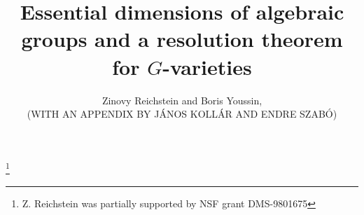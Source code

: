 \newcommand{\k}{{\bold k}}

\newcommand{\isomo}{\overset{\sim}{=}}
\newcommand{\isomoto}{\overset{\sim}{\to}}
\newcommand{\greater}{\underset{\sim}{>}}
\newcommand{\brokrarr}{\dasharrow}
\newcommand{\lf}{\mathopen}

\let \ringaccent=\r  %

\let\r=\mathclose

\newcommand{\notdiv}{\mathrel{\not|}}

\newcommand{\paru}{Parusi\'nski}

\let\to=\longrightarrow

\let\tilde=\widetilde
\let\hat=\widehat
{}

\newcommand{\Ker}{\operatorname{Ker}}
\newcommand{\Aut}{\operatorname{Aut}}
\newcommand{\sdp}{\mathbin{{>}\!{\triangleleft}}}
\newcommand{\Graph}{\operatorname{Graph}}
\newcommand{\Alt}{\operatorname{A}}
\newcommand{\GL}{\operatorname{GL}}
\newcommand{\SL}{\operatorname{SL}}
\newcommand{\Spin}{\operatorname{Spin}}
\newcommand{\PGL}{\operatorname{PGL}}
\newcommand{\PGLn}{\PGL_n}
\newcommand{\rank}{\operatorname{rank}}
\newcommand{\Stab}{\operatorname{Stab}}
\newcommand{\aut}{\operatorname{Aut}}
\newcommand{\Char}{\operatorname{char}} %
\newcommand{\ed}{\operatorname{ed}}
\newcommand{\Gal}{\operatorname{Gal}}
\newcommand{\galois}{\Gal}
\newcommand{\GLn}{\GL_n}
\newcommand{\lra}{\longrightarrow}
\newcommand{\Mat}{\operatorname{M}}
\newcommand{\Mn}{\Mat_n}
\newcommand{\ord}{\mathop{\rm ord}\nolimits}
\newcommand{\trdeg}{\operatorname{trdeg}}
\newcommand{\Sym}{{\operatorname{S}}}
\newcommand{\tr}{\operatorname{tr}}
\newcommand{\Oct}{\operatorname{O}}
\newcommand{\trace}{\tr}

\newsymbol{}
\newsymbol{}
\newsymbol{}



 



\title[G-varieties, 8-30-99]{Essential dimensions of algebraic groups
and a resolution theorem for $G$-varieties}
\author[Z. REICHSTEIN and B. YOUSSIN,  8-28-99]
{Zinovy Reichstein and Boris Youssin, \\ 
(WITH AN APPENDIX BY J{\'A}NOS KOLL{\'A}R AND ENDRE SZAB{\'O})}
\thanks{Z. Reichstein was partially supported by NSF grant DMS-9801675}


